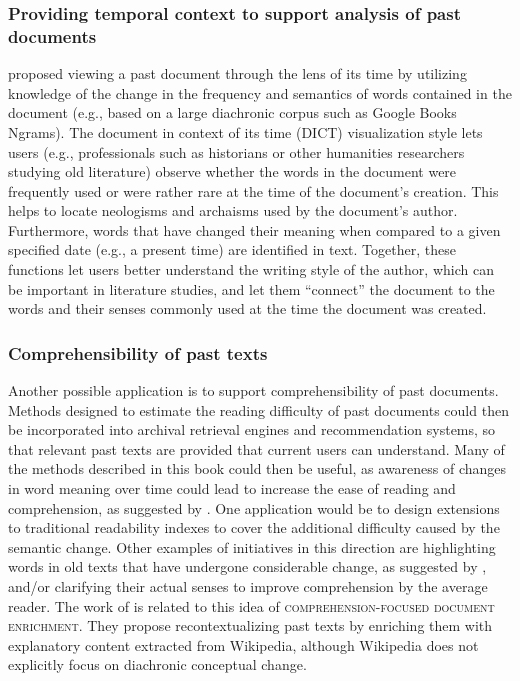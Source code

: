 \documentclass[output=paper]{langsci/langscibook}
\begin{document}
\subsubsection{Providing temporal context to support analysis of past documents} \citet{10.1145/3357384.3357844} proposed viewing a past document through the lens of its time by utilizing knowledge of the change in the frequency and semantics of words contained in the document (e.g., based on a large diachronic corpus such as Google Books Ngrams). The document in context of its time (DICT) visualization style lets users (e.g., professionals such as historians or other humanities researchers studying old literature) observe whether the words in the document were frequently used or were rather rare at the time of the document's creation. This helps to locate neologisms and archaisms used by the document's author. Furthermore, words that have changed their meaning when compared to a given specified date (e.g., a present time) are identified in text. Together, these functions let users better understand the writing style of the author, which can be important in literature studies, and let them ``connect'' the document to the words and their senses commonly used at the time the document was created.

\subsubsection{Comprehensibility of past texts} 
Another possible application is to support comprehensibility  of past documents. Methods designed to estimate the reading difficulty of past documents could then be  incorporated into archival retrieval engines and recommendation systems, so that relevant past texts are provided that current users can understand. 
Many of the methods described in this book could then be useful, as awareness of changes in word meaning over time could lead to increase the ease of reading and comprehension, as suggested by \citet{tahmasebi2013role}. One application would be to design extensions to traditional readability indexes to cover the additional difficulty caused by the semantic change. Other examples of initiatives in this direction are highlighting words in old texts that have undergone considerable change, as suggested by \citet{10.1145/3357384.3357844}, and/or clarifying their actual senses to improve comprehension by the average reader. The work of \citet{tran:2015:bps:2684822.2685315} is related to this idea of \textsc{comprehension-focused document enrichment}. They propose recontextualizing past texts by enriching them with explanatory content extracted from Wikipedia, although Wikipedia does not explicitly focus on diachronic conceptual change.
\end{document}
